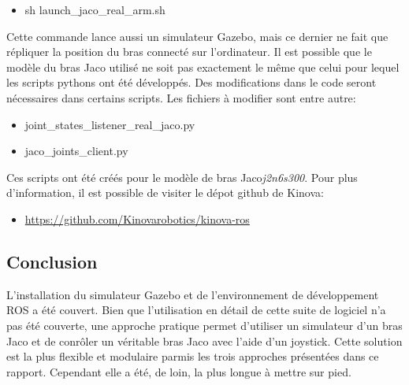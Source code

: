 \documentclass[root.tex]{subfiles}
\begin{document}
\begin{itemize}
\item sh launch\_jaco\_real\_arm.sh
\end{itemize}
Cette commande lance aussi un simulateur Gazebo, mais ce dernier ne fait que répliquer la position du bras connecté sur l'ordinateur.
Il est possible que le modèle du bras Jaco utilisé ne soit pas exactement le même que celui pour lequel les scripts pythons ont été développés. Des modifications dans le code seront nécessaires dans certains scripts. Les fichiers à modifier sont entre autre:
\begin{itemize}
\item joint\_states\_listener\_real\_jaco.py
\item jaco\_joints\_client.py
\end{itemize}
Ces scripts ont été créés pour le modèle de bras Jaco\textit{j2n6s300}. Pour plus d'information, il est possible de visiter le dépot github de Kinova:
\begin{itemize}
\item \url{https://github.com/Kinovarobotics/kinova-ros}
\end{itemize}


\subsection{Conclusion}

L'installation du simulateur Gazebo et de l'environnement de développement ROS a été couvert. 
Bien que l'utilisation en détail de cette suite de logiciel n'a pas été couverte, une approche pratique permet d'utiliser un simulateur d'un bras Jaco et de conrôler un véritable bras Jaco avec l'aide d'un joystick.
Cette solution est la plus flexible et modulaire parmis les trois approches présentées dans ce rapport.
Cependant elle a été, de loin, la plus longue à mettre sur pied.

\newpage
\end{document}
